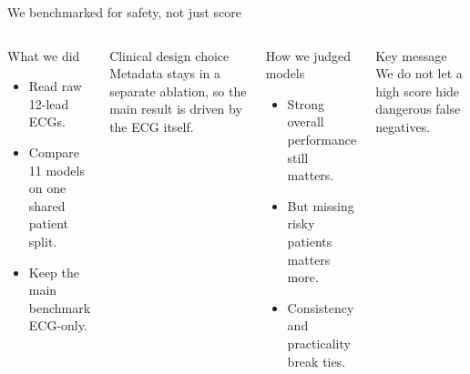 \documentclass[11pt,aspectratio=169]{beamer}
\begin{document}
\begin{frame}[t]{We benchmarked for safety, not just score}
\begin{columns}[T,onlytextwidth]
\begin{block}{What we did}
\begin{itemize}
  \item Read raw 12-lead ECGs.
  \item Compare 11 models on one shared patient split.
  \item Keep the main benchmark ECG-only.
\end{itemize}
\end{block}

\begin{exampleblock}{Clinical design choice}
Metadata stays in a separate ablation, so the main result is driven by the ECG itself.
\end{exampleblock}

\begin{block}{How we judged models}
\begin{itemize}
  \item Strong overall performance still matters.
  \item But missing risky patients matters more.
  \item Consistency and practicality break ties.
\end{itemize}
\end{block}

\begin{alertblock}{Key message}
We do not let a high score hide dangerous false negatives.
\end{alertblock}
\end{columns}
\end{frame}
\end{document}

